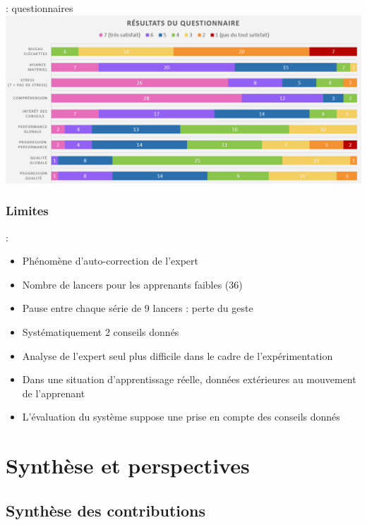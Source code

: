 \documentclass[svgnames]{beamer}
\begin{document}
	\begin{frame}{\subsubsecname : questionnaires}
	\centering
		\includegraphics[scale=0.4]{img/graph_questionnaires.png}
	\end{frame}	
	
	\subsubsection{Limites}
	\begin{frame}{\subsecname : \MakeLowercase{\subsubsecname}}
		\begin{itemize}[label=$\bullet$]
			\item Phénomène d'auto-correction de l'expert
			\item Nombre de lancers pour les apprenants faibles (36)
			\item Pause entre chaque série de 9 lancers : perte du geste
			\item Systématiquement 2 conseils donnés
			\item Analyse de l'expert seul plus difficile dans le cadre de l'expérimentation
			\item Dans une situation d'apprentissage réelle, données extérieures au mouvement de l'apprenant
			\item L'évaluation du système suppose une prise en compte des conseils donnés
		\end{itemize}
	\end{frame}
	
	\section{Synthèse et perspectives}
	\subsection{Synthèse des contributions}
	
\end{document}
